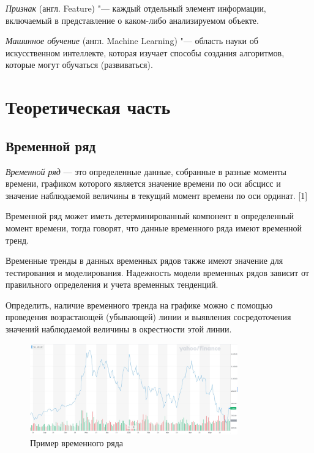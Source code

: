 \documentclass[bachelor, och, coursework]{SCWorks}
\begin{document}
    \textit{Признак} (англ. Feature) "--- каждый отдельный элемент информации,
    включаемый в представление о каком-либо анализируемом объекте.

    \textit{Машинное обучение} (англ. Machine Learning) "--- область науки об
    искусственном интеллекте, которая изучает способы создания алгоритмов,
    которые могут обучаться (развиваться).


\section{Теоретическая часть}

    \subsection{Временной ряд}

        \textit{Временной ряд} — это определенные данные, собранные в разные 
        моменты времени, графиком которого является значение времени по оси абсцисс
        и значение наблюдаемой величины в текущий момент времени по оси ординат. [1]

        Временной ряд может иметь детерминированный компонент в определенный момент
        времени, тогда говорят, что данные временного ряда имеют временной тренд.
    
        Временные тренды в данных временных рядов также имеют значение для тестирования 
        и моделирования. Надежность модели временных рядов зависит от правильного 
        определения и учета временных тенденций.
    
        Определить, наличие временного тренда на графике можно с помощью проведения
        возрастающей (убывающей) линии и выявления сосредоточения значений наблюдаемой
        величины в окрестности этой линии.

        \begin{figure}[H]
            \centering
            \includegraphics[width=0.8\textwidth]{pic/timeseries.jpg}
            \caption{Пример временного ряда}
        \end{figure}
\end{document}

